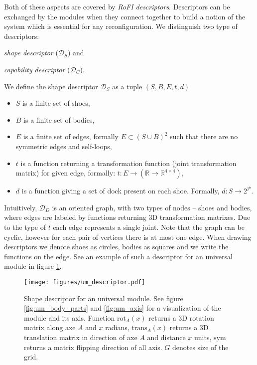 Both of these aspects are covered by \emph{RoFI descriptors}. Descriptors can be
exchanged by the modules when they connect together to build a notion of the
system which is essential for any reconfiguration. We distinguish two type of
descriptors:
\begin{enumerate*}
    \item \emph{shape descriptor} ($\mathcal{D}_S$) and
    \item \emph{capability descriptor} ($\mathcal{D}_C$).
\end{enumerate*}

We define the shape descriptor $\mathcal{D}_S$ as a tuple $(S, B, E, t, d)$
\begin{itemize}
    \item $S$ is a finite set of shoes,
    \item $B$ is a finite set of bodies,
    \item $E$ is a finite set of edges, formally $E \subset (S\cup B)^2$ such
    that there are no symmetric edges and self-loops,
    \item $t$ is a function returning a transformation function (joint
    transformation matrix) for given edge, formally: $t:
    E\rightarrow(\mathds{R}\rightarrow\mathds{R}^{4\times4})$,
    \item $d$ is a function giving a set of dock present on each shoe. Formally,
    $d: S\rightarrow 2^\mathcal{P}$.
\end{itemize}
Intuitively, $\mathcal{D}_D$ is an oriented graph, with two types of nodes --
shoes and bodies, where edges are labeled by functions returning 3D
transformation matrixes. Due to the type of $t$ each edge represents a single
joint. Note that the graph can be cyclic, however for each pair of vertices
there is at most one edge. When drawing descriptors we denote shoes as circles,
bodies as squares and we write the functions on the edge. See an example of such
a descriptor for an universal module in figure \ref{fig:um_descriptor}.

\begin{figure}[h!]
    \centering
    \texttt{[image: figures/um\_descriptor.pdf]}
    \caption{Shape descriptor for an universal module. See figure
    \ref{fig:um_body_parts} and \ref{fig:um_axis} for a visualization of the
    module and its axis. Function $\text{rot}_A(x)$ returns a 3D rotation matrix
    along axe $A$ and $x$ radians, $\text{trans}_A(x)$ returns a 3D translation
    matrix in direction of axe $A$ and distance $x$ units, $\text{sym}$ returns
    a matrix flipping direction of all axis. $G$ denotes size of the grid.}
    \label{fig:um_descriptor}
\end{figure}


